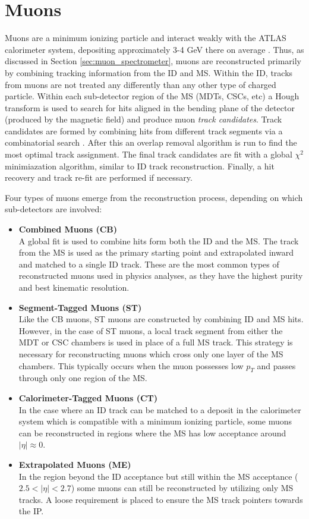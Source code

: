 \section{Muons}
Muons are a minimum ionizing particle and interact weakly with the ATLAS calorimeter system, depositing approximately 3-4 GeV there on average \cite{Lenzi_2010}.
Thus, as discussed in Section \ref{sec:muon_spectrometer}, muons are reconstructed primarily by combining tracking information from the ID and MS.
Within the ID, tracks from muons are not treated any differently than any other type of charged particle.
Within each sub-detector region of the MS (MDTs, CSCs, etc) a Hough transform \cite{10.1016/S0734-189X(88)80033-1} is used to search for hits aligned in the bending plane of the detector (produced by the magnetic field) and produce muon \textit{track candidates}.
Track candidates are formed by combining hits from different track segments via a combinatorial search \cite{Aad:2016jkr}.
After this an overlap removal algorithm is run to find the most optimal track assignment.
The final track candidates are fit with a global $\chi^2$ minimiazation algorithm, similar to ID track reconstruction.
Finally, a hit recovery and track re-fit are performed if necessary.

Four types of muons emerge from the reconstruction process, depending on which sub-detectors are involved:
\begin{itemize}
    \item \textbf{Combined Muons (CB)}\\
        A global fit is used to combine hits form both the ID and the MS.
        The track from the MS is used as the primary starting point and extrapolated inward and matched to a single ID track.
        These are the most common types of reconstructed muons used in physics analyses, as they have the highest purity and best kinematic resolution.
    \item \textbf{Segment-Tagged Muons (ST)}\\
        Like the CB muons, ST muons are constructed by combining ID and MS hits.
        However, in the case of ST muons, a local track segment from either the MDT or CSC chambers is used in place of a full MS track.
        This strategy is necessary for reconstructing muons which cross only one layer of the MS chambers.
        This typically occurs when the muon possesses low $p_T$ and passes through only one region of the MS.
    \item \textbf{Calorimeter-Tagged Muons (CT)}\\
        In the case where an ID track can be matched to a deposit in the calorimeter system which is compatible with a minimum ionizing particle, some muons can be reconstructed in regions where the MS has low acceptance around $|\eta| \approx 0$.
    \item \textbf{Extrapolated Muons (ME)}\\
        In the region beyond the ID acceptance but still within the MS acceptance ($2.5 < |\eta| < 2.7$) some muons can still be reconstructed by utilizing only MS tracks. A loose requirement is placed to ensure the MS track pointers towards the IP.
\end{itemize}

